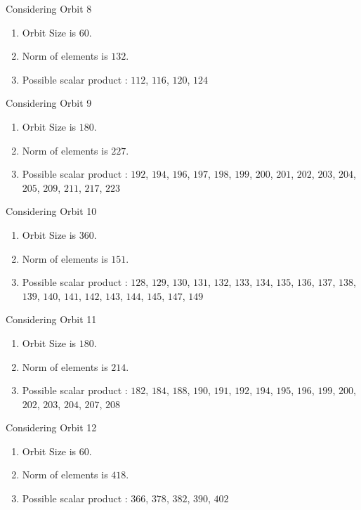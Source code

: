 \documentclass[12pt]{article}
\begin{document}
Considering Orbit 8
\begin{enumerate}
\item Orbit Size is $60$.
\item Norm of elements is $132$.
\item Possible scalar product : $112$, $116$, $120$, $124$
\end{enumerate}
Considering Orbit 9
\begin{enumerate}
\item Orbit Size is $180$.
\item Norm of elements is $227$.
\item Possible scalar product : $192$, $194$, $196$, $197$, $198$, $199$, $200$, $201$, $202$, $203$, $204$, $205$, $209$, $211$, $217$, $223$
\end{enumerate}
Considering Orbit 10
\begin{enumerate}
\item Orbit Size is $360$.
\item Norm of elements is $151$.
\item Possible scalar product : $128$, $129$, $130$, $131$, $132$, $133$, $134$, $135$, $136$, $137$, $138$, $139$, $140$, $141$, $142$, $143$, $144$, $145$, $147$, $149$
\end{enumerate}
Considering Orbit 11
\begin{enumerate}
\item Orbit Size is $180$.
\item Norm of elements is $214$.
\item Possible scalar product : $182$, $184$, $188$, $190$, $191$, $192$, $194$, $195$, $196$, $199$, $200$, $202$, $203$, $204$, $207$, $208$
\end{enumerate}
Considering Orbit 12
\begin{enumerate}
\item Orbit Size is $60$.
\item Norm of elements is $418$.
\item Possible scalar product : $366$, $378$, $382$, $390$, $402$
\end{enumerate}
\end{document}
